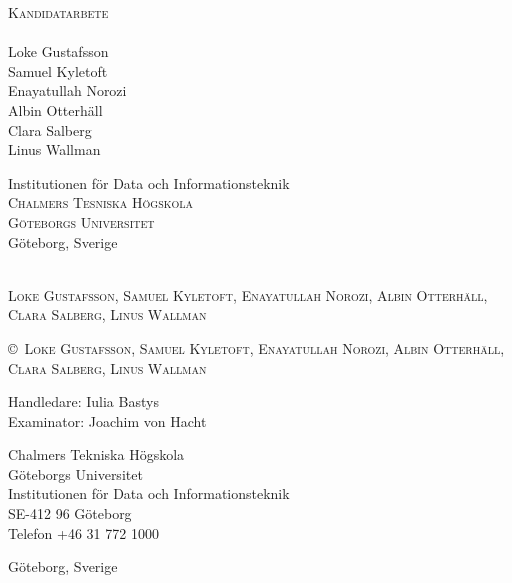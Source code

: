\newpage
\thispagestyle{empty}
\begin{center}

	\textsc{\large Kandidatarbete \the\year }\\[4cm]

	\textbf{\Large \ambaTitle} \\[1cm]

    {\linespread{1.2}\large
	Loke Gustafsson \\
	Samuel Kyletoft \\
	Enayatullah Norozi \\
	Albin Otterhäll \\
	Clara Salberg \\
	Linus Wallman \\
    }

	\vfill

	Institutionen för Data och Informationsteknik \\
	\textsc{Chalmers Tesniska Högskola} \\
	\textsc{Göteborgs Universitet} \\
	Göteborg, Sverige \the\year \\
\end{center}


\newpage
{\ambaTitle}\\
\textsc{Loke Gustafsson, Samuel Kyletoft, Enayatullah Norozi, Albin Otterhäll, Clara Salberg, Linus Wallman}
\setlength{\parskip}{0.5cm}

\copyright{~\textsc{Loke Gustafsson, Samuel Kyletoft, Enayatullah Norozi, Albin Otterhäll, Clara Salberg, Linus Wallman \the\year}}
\setlength{\parskip}{1cm}

Handledare: Iulia Bastys \\
Examinator: Joachim von Hacht \setlength{\parskip}{1cm}

Chalmers Tekniska Högskola\\
Göteborgs Universitet\\
Institutionen för Data och Informationsteknik\\
SE-412 96 Göteborg\\
Telefon +46 31 772 1000 \setlength{\parskip}{0.5cm}

\vfill
Göteborg, Sverige \the\year
